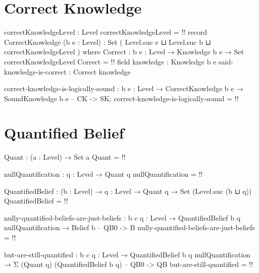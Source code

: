 \documentclass{article}
\begin{document}
\section{Correct Knowledge}

\begin{code}
correctKnowledgeLevel : Level
correctKnowledgeLevel = {!!}
record CorrectKnowledge (b e : Level) :
                        Set ( Level.suc e
                            ⊔ Level.suc b
                            ⊔ correctKnowledgeLevel
                            ) where
  Correct : {b e : Level} → Knowledge b e → Set correctKnowledgeLevel
  Correct = {!!}
  field
    knowledge : Knowledge b e
    said-knowledge-is-correct : Correct knowledge
\end{code}

\begin{code}
correct-knowledge-is-logically-sound :
  {b e : Level} → CorrectKnowledge b e → SoundKnowledge b e -- CK -> SK;
correct-knowledge-is-logically-sound = {!!}
\end{code}

\section{Quantified Belief}

\begin{code}
Quant : (a : Level) → Set a
Quant = {!!}
\end{code}

\begin{code}
nullQuantification : {q : Level} → Quant q
nullQuantification = {!!}
\end{code}

\begin{code}
QuantifiedBelief : (b : Level) → {q : Level} → Quant q → Set (Level.suc (b ⊔ q))
QuantifiedBelief = {!!}
\end{code}

\begin{code}
nully-quantified-beliefs-are-just-beliefs :
  {b c q : Level} → QuantifiedBelief b {q} nullQuantification → Belief b -- QB0 -> B
nully-quantified-beliefs-are-just-beliefs = {!!}
\end{code}

\begin{code}
but-are-still-quantified :
  {b c q : Level} →
  QuantifiedBelief b {q} nullQuantification →
  Σ (Quant q) (QuantifiedBelief b {q}) -- QB0 -> QB
but-are-still-quantified = {!!}
\end{code}
\end{document}
